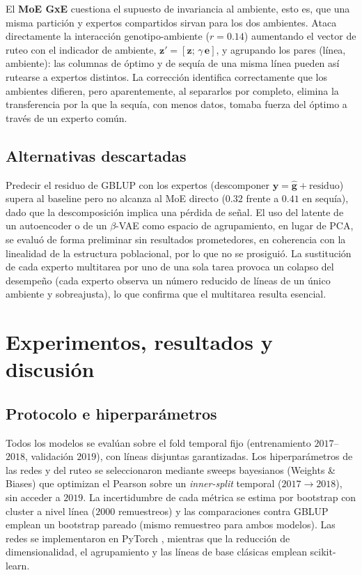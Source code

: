 \documentclass[conference]{IEEEtran}
\begin{document}
El \textbf{MoE GxE} cuestiona el supuesto de invariancia al ambiente, esto es, que una misma partición y expertos compartidos sirvan para los dos ambientes. Ataca directamente la interacción genotipo-ambiente ($r=0.14$) aumentando el vector de ruteo con el indicador de ambiente, $\mathbf{z}'=[\mathbf{z};\,\gamma\,\mathbf{e}]$, y agrupando los pares (línea, ambiente): las columnas de óptimo y de sequía de una misma línea pueden así rutearse a expertos distintos. La corrección identifica correctamente que los ambientes difieren, pero aparentemente, al separarlos por completo, elimina la transferencia por la que la sequía, con menos datos, tomaba fuerza del óptimo a través de un experto común. 

\subsection{Alternativas descartadas}
Predecir el residuo de GBLUP con los expertos (descomponer $\mathbf{y}=\hat{\mathbf{g}}+\text{residuo}$) supera al baseline pero no alcanza al MoE directo ($0.32$ frente a $0.41$ en sequía), dado que la descomposición implica una pérdida de señal. El uso del latente de un autoencoder o de un $\beta$-VAE como espacio de agrupamiento, en lugar de PCA, se evaluó de forma preliminar sin resultados prometedores, en coherencia con la linealidad de la estructura poblacional, por lo que no se prosiguió. La sustitución de cada experto multitarea por uno de una sola tarea provoca un colapso del desempeño (cada experto observa un número reducido de líneas de un único ambiente y sobreajusta), lo que confirma que el multitarea resulta esencial. 

\section{Experimentos, resultados y discusión}\label{sec:resultados}
\subsection{Protocolo e hiperparámetros}
Todos los modelos se evalúan sobre el fold temporal fijo (entrenamiento $2017$--$2018$, validación $2019$), con líneas disjuntas garantizadas. Los hiperparámetros de las redes y del ruteo se seleccionaron mediante sweeps bayesianos (Weights \& Biases) que optimizan el Pearson sobre un \textit{inner-split} temporal ($2017\rightarrow2018$), sin acceder a $2019$. La incertidumbre de cada métrica se estima por bootstrap con cluster a nivel línea ($2000$ remuestreos) y las comparaciones contra GBLUP emplean un bootstrap pareado (mismo remuestreo para ambos modelos). Las redes se implementaron en PyTorch , mientras que la reducción de dimensionalidad, el agrupamiento y las líneas de base clásicas emplean scikit-learn.
\end{document}
